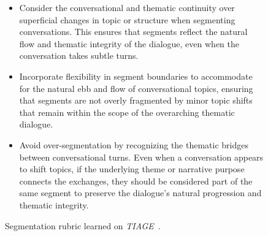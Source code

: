 \begin{figure}[htbp]
\begin{tcolorbox}[left=3pt,right=3pt,top=3pt,bottom=3pt,title=\textbf{Segmentation rubric learned from \textit{TIAGE}}]
\begin{itemize}
    \item Consider the conversational and thematic continuity over superficial changes in topic or structure when segmenting conversations. This ensures that segments reflect the natural flow and thematic integrity of the dialogue, even when the conversation takes subtle turns.

    \item Incorporate flexibility in segment boundaries to accommodate for the natural ebb and flow of conversational topics, ensuring that segments are not overly fragmented by minor topic shifts that remain within the scope of the overarching thematic dialogue.

    \item Avoid over-segmentation by recognizing the thematic bridges between conversational turns. Even when a conversation appears to shift topics, if the underlying theme or narrative purpose connects the exchanges, they should be considered part of the same segment to preserve the dialogue's natural progression and thematic integrity.
\end{itemize}
\end{tcolorbox}
\caption{Segmentation rubric learned on \textit{TIAGE}~\citep{xie2021tiage}.}
\label{fig: segmentation_rubric_tiage}
\end{figure}


